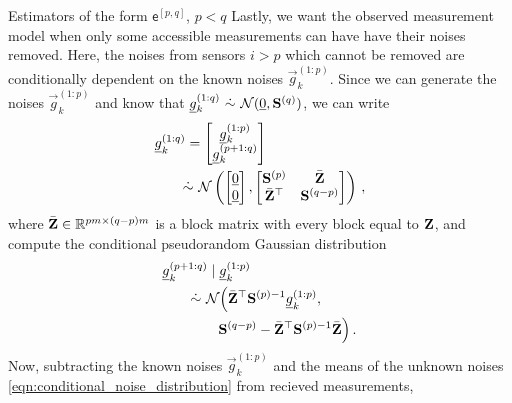 \documentclass[letterpaper, 10 pt, conference]{ieeeconf}
\begin{document}
\begin{LaTeXdescription}
  \item[Estimators of the form $\mathsf{e}^{[p,q]}$, $p<q$] Lastly, we want the observed measurement model when only some accessible measurements can have have their noises removed. Here, the noises from sensors $i>p$ which cannot be removed are conditionally dependent on the known noises $\vec{g}_k^{(1:p)}$. Since we can generate the noises $\vec{g}_k^{(1:p)}$ and know that $\vec{g}_k^{(1:q)}\ \dot{\sim}\ \mathcal{N}(\vec{0}, \mat{S}^{(q)})$, we can write 
  \begin{equation}\label{eqn:block_noises_and_correlation}
    \begin{split}
      &{\underline{g}}_k^{(1:q)}=
      \begin{bmatrix}
        {\underline{g}}_k^{(1:p)}\\
        {\underline{g}}_k^{(p+1:q)}\\
      \end{bmatrix}\\ 
      &\qquad \dot{\sim}\ \mathcal{N}\left(
      \begin{bmatrix}
        {\underline{0}}\\
        {\underline{0}}
      \end{bmatrix},
      \begin{bmatrix}
        {\ensuremath{{\mathbf{S}}}}^{(p)} & \bar{{{\mathbf{Z}}}}\\
        \bar{{{\mathbf{Z}}}}^\top & {{\mathbf{S}}}^{(q-p)}
      \end{bmatrix}\right)\,,
    \end{split}
  \end{equation}
  where $\bar{{{\mathbf{Z}}}} \in \mathbb{R}^{pm \times (q-p)m}$ is a block matrix with every block equal to ${{\mathbf{Z}}}$, and compute the conditional pseudorandom Gaussian distribution
  \begin{equation}\label{eqn:conditional_noise_distribution}
    \begin{split}
      &\vec{g}_k^{(p+1:q)} \mid \vec{g}_k^{(1:p)}\\
      &\qquad \dot{\sim}\ \mathcal{N}\Big(\bar{\mat{Z}}^\top\mat{S}^{(p)-1}\vec{g}_k^{(1:p)},\\
      &\qquad\qquad \mat{S}^{(q-p)} - \bar{\mat{Z}}^\top\mat{S}^{(p)-1}\bar{\mat{Z}}\Big)\,.
    \end{split}
  \end{equation}
  Now, subtracting the known noises $\vec{g}_k^{(1:p)}$ and the means of the unknown noises \eqref{eqn:conditional_noise_distribution} from recieved measurements,
  \begin{equation}\label{eqn:pq_measurement_offset}

\end{equation}
\end{LaTeXdescription}
\end{document}
